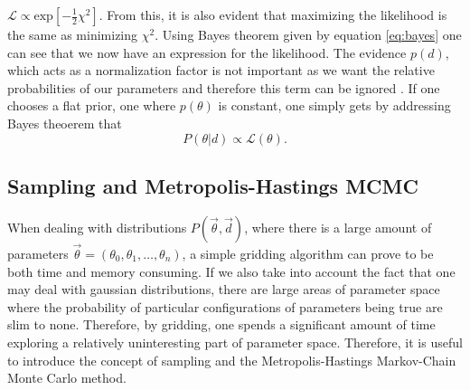 $\mathcal{L}\propto \mathrm{exp}[-\frac{1}{2}\chi^2]$. From this, it is also evident that
maximizing the likelihood is the same as minimizing $\chi^2$. Using Bayes theorem given by equation
\ref{eq:bayes} one can see that we now have an expression for the likelihood.
The evidence $p(d)$, which acts as a normalization factor is not important as we
want the relative probabilities of our parameters and therefore this term can be
ignored \cite{heavens2010statistical}. If one chooses a flat prior, one where
$p(\theta)$ is constant, one simply gets by addressing Bayes theoerem that
\begin{equation}
    P(\theta\vert d) \propto \mathcal{L}(\theta).
\end{equation}
\subsection{Sampling and Metropolis-Hastings MCMC}
When dealing with distributions $P(\vec{\theta},\vec{d})$, where there is a
large amount of parameters $\vec{\theta}=(\theta_0, \theta_1,\dots, \theta_n)$,
a simple gridding algorithm can prove to be both time and memory consuming. If
we also take into account the fact that one may deal with gaussian
distributions, there are large areas of parameter space where the probability of
particular configurations of parameters being true are slim to none.
Therefore, by gridding, one spends a significant amount of time exploring a relatively
uninteresting part of parameter space. Therefore, it is useful to introduce the
concept of sampling and the Metropolis-Hastings Markov-Chain Monte Carlo
method.\\

